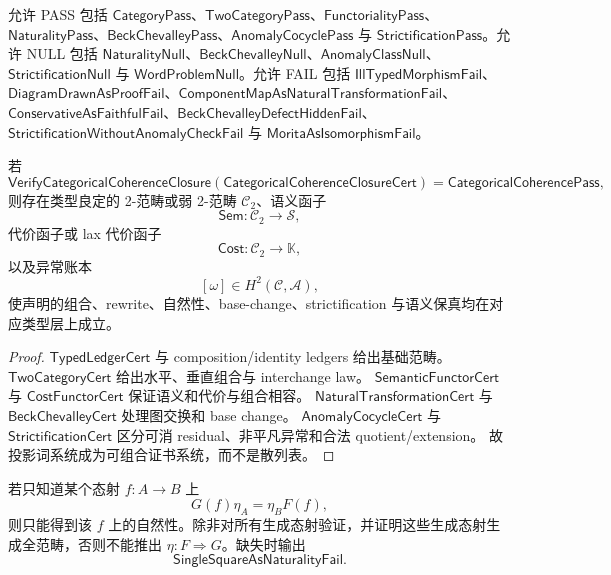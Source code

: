 允许 PASS 包括 \(\mathsf{CategoryPass}\)、\(\mathsf{TwoCategoryPass}\)、\(\mathsf{FunctorialityPass}\)、\(\mathsf{NaturalityPass}\)、\(\mathsf{BeckChevalleyPass}\)、\(\mathsf{AnomalyCocyclePass}\) 与 \(\mathsf{StrictificationPass}\)。允许 NULL 包括 \(\mathsf{NaturalityNull}\)、\(\mathsf{BeckChevalleyNull}\)、\(\mathsf{AnomalyClassNull}\)、\(\mathsf{StrictificationNull}\) 与 \(\mathsf{WordProblemNull}\)。允许 FAIL 包括 \(\mathsf{IllTypedMorphismFail}\)、\(\mathsf{DiagramDrawnAsProofFail}\)、\(\mathsf{ComponentMapAsNaturalTransformationFail}\)、\(\mathsf{ConservativeAsFaithfulFail}\)、\(\mathsf{BeckChevalleyDefectHiddenFail}\)、\(\mathsf{StrictificationWithoutAnomalyCheckFail}\) 与 \(\mathsf{MoritaAsIsomorphismFail}\)。

\begin{theorem}\label{thm:typed-address-biaxial-completion-categorical-coherence-soundness}
若
\[
\mathsf{VerifyCategoricalCoherenceClosure}
(\mathsf{CategoricalCoherenceClosureCert})
=
\mathsf{CategoricalCoherencePass},
\]
则存在类型良定的 2-范畴或弱 2-范畴 \(\mathcal C_2\)、语义函子
\[
\mathsf{Sem}:\mathcal C_2\to\mathcal S,
\]
代价函子或 lax 代价函子
\[
\mathsf{Cost}:\mathcal C_2\to\mathbb K,
\]
以及异常账本
\[
[\omega]\in H^2(\mathcal C,\mathcal A),
\]
使声明的组合、rewrite、自然性、base-change、strictification 与语义保真均在对应类型层上成立。
\end{theorem}

\begin{proof}
\(\mathsf{TypedLedgerCert}\) 与 composition/identity ledgers 给出基础范畴。
\(\mathsf{TwoCategoryCert}\) 给出水平、垂直组合与 interchange law。
\(\mathsf{SemanticFunctorCert}\) 与 \(\mathsf{CostFunctorCert}\) 保证语义和代价与组合相容。
\(\mathsf{NaturalTransformationCert}\) 与 \(\mathsf{BeckChevalleyCert}\) 处理图交换和 base change。
\(\mathsf{AnomalyCocycleCert}\) 与 \(\mathsf{StrictificationCert}\) 区分可消 residual、非平凡异常和合法 quotient/extension。
故投影词系统成为可组合证书系统，而不是散列表。
\end{proof}

\begin{theorem}[单个方块不推出自然性]\label{thm:typed-address-biaxial-completion-single-square-not-naturality}
若只知道某个态射 \(f:A\to B\) 上
\[
G(f)\eta_A=\eta_BF(f),
\]
则只能得到该 \(f\) 上的自然性。除非对所有生成态射验证，并证明这些生成态射生成全范畴，否则不能推出 \(\eta:F\Rightarrow G\)。缺失时输出
\[
\boxed{\mathsf{SingleSquareAsNaturalityFail}.}
\]
\end{theorem}

